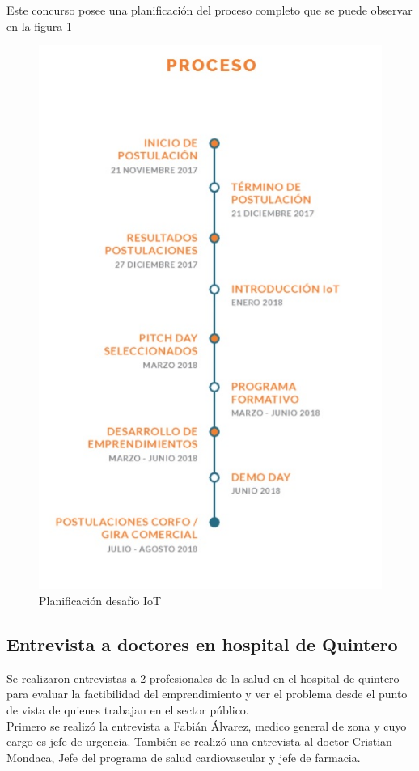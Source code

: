 \newpage
Este concurso posee una planificación del proceso completo que se puede observar en la figura \ref{proceso}

\begin{figure}[H]
\centering
\includegraphics[scale=0.85]{figuras/chamullo/proceso.jpg}
\caption{Planificación desafío IoT}
\label{proceso}
\end{figure}


\subsection{Entrevista a doctores en hospital de Quintero}
Se realizaron entrevistas a 2 profesionales de la salud en el hospital de quintero para evaluar la factibilidad del emprendimiento y ver el problema desde el punto de vista de quienes trabajan en el sector público.\\
Primero se realizó la entrevista a Fabián Álvarez, medico general de zona y cuyo cargo es jefe de urgencia. También se realizó una entrevista al doctor Cristian Mondaca, Jefe del programa de salud cardiovascular y jefe de farmacia. 
